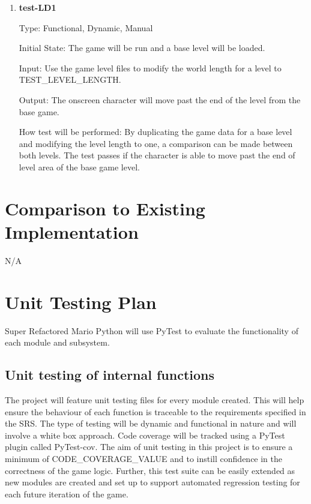 \documentclass[12pt, titlepage]{article}
\begin{document}
\begin{enumerate}

\item{\textbf{test-LD1\\}}

Type: Functional, Dynamic, Manual

Initial State: The game will be run and a base level will be loaded.

Input: Use the game level files to modify the world length for a level to TEST\_LEVEL\_LENGTH.

Output: The onscreen character will move past the end of the level from the base game.

How test will be performed: By duplicating the game data for a base level and modifying the level length to one, a comparison can be made between both levels. The test passes if the character is able to move past the end of level area of the base game level.

\end{enumerate}



\section{Comparison to Existing Implementation}
N/A



\section{Unit Testing Plan}
Super Refactored Mario Python will use PyTest to evaluate the functionality of each module and subsystem.
\subsection{Unit testing of internal functions}
	The project will feature unit testing files for every module created. This will help ensure the behaviour of each function is traceable to the requirements specified in the SRS. The type of testing will be dynamic and functional in nature and will involve a white box approach. Code coverage will be tracked using a PyTest plugin called PyTest-cov. The aim of unit testing in this project is to ensure a minimum of CODE\_COVERAGE\_VALUE and to instill confidence in the correctness of the game logic. Further, this test suite can be easily extended as new modules are created and set up to support automated regression testing for each future iteration of the game.
\end{document}
